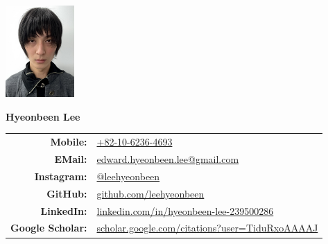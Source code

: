 \documentclass[a4paper,10pt]{extarticle}
\begin{document}
\pagestyle{empty}



\begin{minipage}{0.1\textwidth}
	\begin{flushleft}
		\includegraphics[height=3.5cm]{photo_dlicense.jpeg}
	\end{flushleft}
\end{minipage}
\hfill
\begin{minipage}{0.7\textwidth}
	\begin{flushright}
		\textbf{\Large Hyeonbeen Lee} %
		\newline\newline
		\begin{tabular}{rl}
			\textbf{Mobile: }         & \href{tel:+82-10-6236-4693}{+82-10-6236-4693}                                                                 \\
			\textbf{EMail: }          & \href{mailto:edward.hyeonbeen.lee@gmail.com}{edward.hyeonbeen.lee@gmail.com}                                  \\
			\textbf{Instagram: }      & \href{https://www.instagram.com/leehyeonbeen}{@leehyeonbeen}                                                  \\
			\textbf{GitHub: }         & \href{https://github.com/leehyeonbeen}{github.com/leehyeonbeen}                                               \\
			\textbf{LinkedIn: }       & \href{https://www.linkedin.com/in/hyeonbeen-lee-239500286/}{linkedin.com/in/hyeonbeen-lee-239500286}          \\
			\textbf{Google Scholar: } & \href{https://scholar.google.com/citations?user=TiduRxoAAAAJ}{scholar.google.com/citations?user=TiduRxoAAAAJ} \\
		\end{tabular}
	\end{flushright}

\end{minipage}
\end{document}
